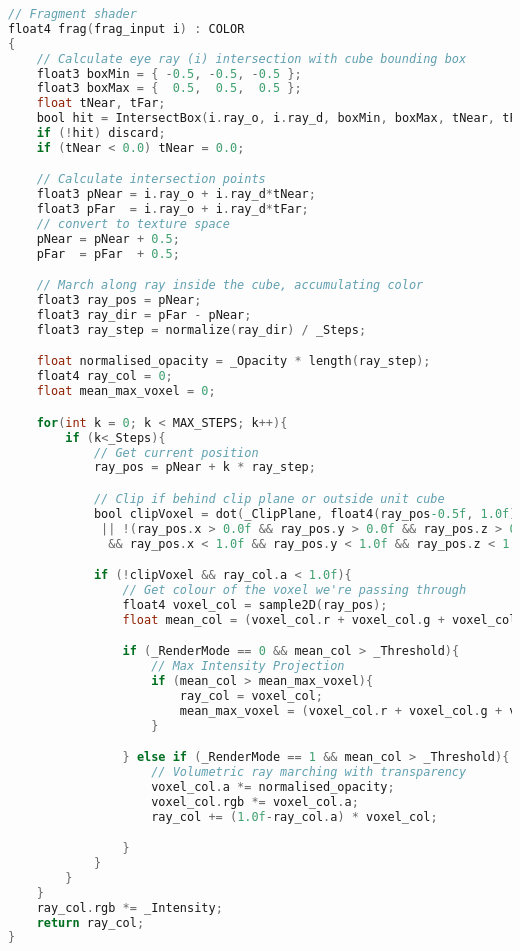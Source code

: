 \begin{lstfloat}
\begin{lstlisting}[language=C,caption={Fragment shader code for volumetric ray marching},label={snip:renderloop},frame=single]
// Fragment shader
float4 frag(frag_input i) : COLOR
{
	// Calculate eye ray (i) intersection with cube bounding box
	float3 boxMin = { -0.5, -0.5, -0.5 };
	float3 boxMax = {  0.5,  0.5,  0.5 };
	float tNear, tFar;
	bool hit = IntersectBox(i.ray_o, i.ray_d, boxMin, boxMax, tNear, tFar);
	if (!hit) discard;
	if (tNear < 0.0) tNear = 0.0;

	// Calculate intersection points
	float3 pNear = i.ray_o + i.ray_d*tNear;
	float3 pFar  = i.ray_o + i.ray_d*tFar;
	// convert to texture space
	pNear = pNear + 0.5;
	pFar  = pFar  + 0.5;

	// March along ray inside the cube, accumulating color
	float3 ray_pos = pNear;
	float3 ray_dir = pFar - pNear;
	float3 ray_step = normalize(ray_dir) / _Steps;

	float normalised_opacity = _Opacity * length(ray_step);
	float4 ray_col = 0;
	float mean_max_voxel = 0;

	for(int k = 0; k < MAX_STEPS; k++){
		if (k<_Steps){
			// Get current position
			ray_pos = pNear + k * ray_step;

			// Clip if behind clip plane or outside unit cube
			bool clipVoxel = dot(_ClipPlane, float4(ray_pos-0.5f, 1.0f)) > 0.0f
			 || !(ray_pos.x > 0.0f && ray_pos.y > 0.0f && ray_pos.z > 0.0f
			  && ray_pos.x < 1.0f && ray_pos.y < 1.0f && ray_pos.z < 1.0f);

			if (!clipVoxel && ray_col.a < 1.0f){
			  	// Get colour of the voxel we're passing through
		  		float4 voxel_col = sample2D(ray_pos);
			  	float mean_col = (voxel_col.r + voxel_col.g + voxel_col.b);

			  	if (_RenderMode == 0 && mean_col > _Threshold){
			  		// Max Intensity Projection
		  			if (mean_col > mean_max_voxel){
		  				ray_col = voxel_col;
		  				mean_max_voxel = (voxel_col.r + voxel_col.g + voxel_col.b);
		  			}

			  	} else if (_RenderMode == 1 && mean_col > _Threshold){
					// Volumetric ray marching with transparency
					voxel_col.a *= normalised_opacity;
					voxel_col.rgb *= voxel_col.a;
					ray_col += (1.0f-ray_col.a) * voxel_col;

				}
			}
		}
	}
	ray_col.rgb *= _Intensity;
    return ray_col;
}
\end{lstlisting}
\end{lstfloat}

